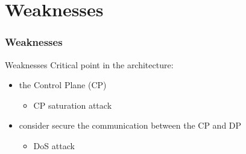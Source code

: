\section{Weaknesses}
\frame
{
\frametitle{Weaknesses}
\tableofcontents[currentsection]
\addtocounter{framenumber}{-1}
}

\begin{frame}{Weaknesses}
Critical point in the architecture:
\begin{itemize}
\item<2-> the Control Plane (CP)
\begin{itemize}
\item<3-> CP saturation attack
\end{itemize}
\item<4-> consider secure the communication between the CP and DP
\begin{itemize}
\item<5-> DoS attack
\end{itemize}
\end{itemize}
\end{frame}
